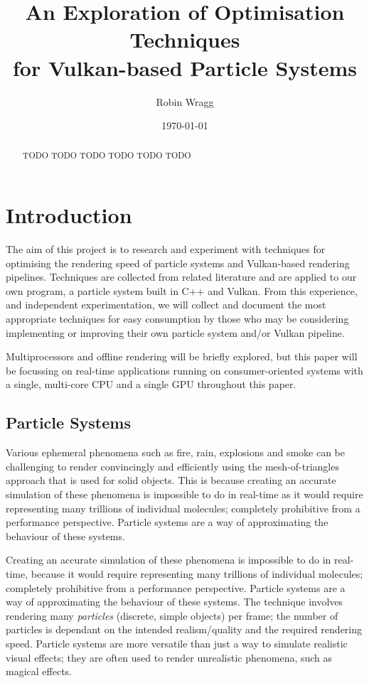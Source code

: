 \documentclass[11pt, a4paper, twocolumn]{article}
\title{\sffamily\bfseries An Exploration of Optimisation Techniques\\for Vulkan-based Particle Systems}
\author{Robin Wragg}
\date{\today}
\begin{document}
\maketitle

\begin{abstract}
TODO TODO TODO TODO TODO TODO
\end{abstract}

\section{Introduction}

The aim of this project is to research and experiment with techniques for optimising the rendering speed of particle systems and Vulkan-based rendering pipelines. Techniques are collected from related literature and are applied to our own program, a particle system built in C++ and Vulkan. From this experience, and independent experimentation, we will collect and document the most appropriate techniques for easy consumption by those who may be considering implementing or improving their own particle system and/or Vulkan pipeline.

Multiprocessors and offline rendering will be briefly explored, but this paper will be focussing on real-time applications running on consumer-oriented systems with a single, multi-core CPU and a single GPU throughout this paper.

\subsection{Particle Systems}

Various ephemeral phenomena such as fire, rain, explosions and smoke can be challenging to render convincingly and efficiently using the mesh-of-triangles approach that is used for solid objects. This is because creating an accurate simulation of these phenomena is impossible to do in real-time as it would require representing many trillions of individual molecules; completely prohibitive from a performance perspective. Particle systems are a way of approximating the behaviour of these systems.

Creating an accurate simulation of these phenomena is impossible to do in real-time, because it would require representing many trillions of individual molecules; completely prohibitive from a performance perspective. Particle systems are a way of approximating the behaviour of these systems. The technique involves rendering many \emph{particles} (discrete, simple objects) per frame; the number of particles is dependant on the intended realism/quality and the required rendering speed. Particle systems are more versatile than just a way to simulate realistic visual effects; they are often used to render unrealistic phenomena, such as magical effects.
\end{document}
